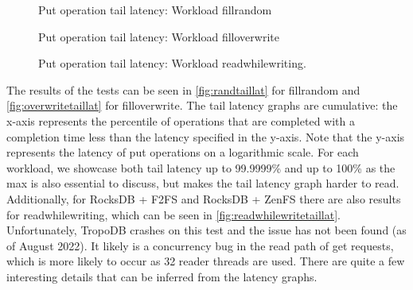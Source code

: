 \begin{figure}[!ht]
    \hspace*{-0.075\textwidth} %
    \raggedleft
    \caption{ Put operation tail latency: Workload fillrandom }
    \label{fig:randtaillat}
\end{figure}


\begin{figure}[!ht]
    \hspace*{-0.075\textwidth} %
    \raggedleft
    \caption{ Put operation tail latency: Workload filloverwrite }
    \label{fig:overwritetaillat}
\end{figure}

\begin{figure}[!ht]
\centering
\begin{minipage}{0.55\textwidth}
  \centering
  
\end{minipage}%
\caption{Put operation tail latency: Workload readwhilewriting.}
\label{fig:readwhilewritetaillat}
\end{figure}



The results of the tests can be seen in \autoref{fig:randtaillat} for fillrandom and \autoref{fig:overwritetaillat} for filloverwrite. The tail latency graphs are cumulative: the x-axis represents the percentile of operations that are completed with a completion time less than the latency specified in the y-axis. Note that the y-axis represents the latency of put operations on a logarithmic scale. For each workload, we showcase both tail latency up to 99.9999\% and up to 100\% as the max is also essential to discuss, but makes the tail latency graph harder to read. Additionally, for RocksDB + F2FS and RocksDB + ZenFS there are also results for readwhilewriting, which can be seen in \autoref{fig:readwhilewritetaillat}. Unfortunately, TropoDB crashes on this test and the issue has not been found (as of August 2022). It likely is a concurrency bug in the read path of get requests, which is more likely to occur as 32 reader threads are used. There are quite a few interesting details that can be inferred from the latency graphs. 


